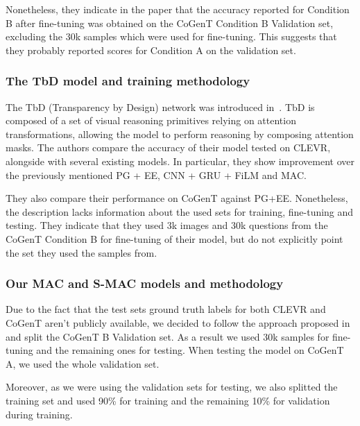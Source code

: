 Nonetheless, they indicate in the paper that the accuracy reported for Condition B after fine-tuning was obtained on the CoGenT Condition B Validation set, excluding the 30k samples which were used for fine-tuning.
This suggests that they probably reported scores for Condition A on the validation set.


\subsubsection{The TbD model and training methodology}

The TbD (Transparency by Design) network was introduced in~\cite{mascharka2018transparency}.
TbD is composed of a set of visual reasoning primitives relying on attention transformations, allowing the model to perform reasoning by composing attention masks.
The authors compare the accuracy of their model tested on CLEVR, alongside with several existing models. In particular, they show improvement over the previously mentioned PG + EE, CNN + GRU + FiLM and MAC.

They also compare their performance on CoGenT against PG+EE.
Nonetheless, the description lacks information about the used sets for training, fine-tuning and testing. 
They indicate that they used 3k images and 30k questions from the CoGenT Condition B for fine-tuning of their model, but do not explicitly point the set they used the samples from.


\subsubsection{Our MAC and S-MAC models and methodology}

Due to the fact that the test sets ground truth labels for both CLEVR and CoGenT aren't publicly available, we decided to follow the approach proposed in~\cite{perez2017film} and split the CoGenT B Validation set.
As a result we used 30k samples for fine-tuning and the remaining ones for testing.
When testing the model on CoGenT A, we used the whole validation set.

Moreover, as we were using the validation sets for testing, we also splitted the training set and used 90\% for training and the remaining 10\% for validation during training.		

